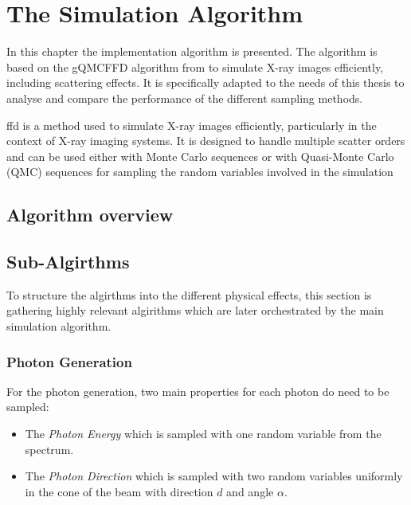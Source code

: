 \chapter{The Simulation Algorithm} %
\label{Chapter5} %


In this chapter the implementation algorithm is presented. The algorithm is
based on the gQMCFFD algorithm from \cite{qmcXray2023} to simulate X-ray images
efficiently, including scattering effects. It is specifically adapted to the
needs of this thesis to analyse and compare the performance of the different
sampling methods.


\ac{ffd} is a method used to simulate X-ray images efficiently, particularly in the context of X-ray imaging systems. It is designed to handle multiple scatter orders and can be used either with Monte Carlo sequences or with Quasi-Monte Carlo (QMC) sequences for sampling the random variables involved in the simulation
\section{Algorithm overview}


\section{Sub-Algirthms}
To structure the algirthms into the different physical effects, this section is
gathering highly relevant algirithms which are later orchestrated by the main
simulation algorithm.

\subsection{Photon Generation}
For the photon generation, two main properties for each photon do need to be
sampled:

\begin{itemize}
    \item The \emph{Photon Energy} which is sampled with one random variable
    from the spectrum.
    \item The \emph{Photon Direction} which is sampled with two random 
    variables uniformly in the cone of the beam with direction $d$ and angle
    $\alpha$. 
\end{itemize}

